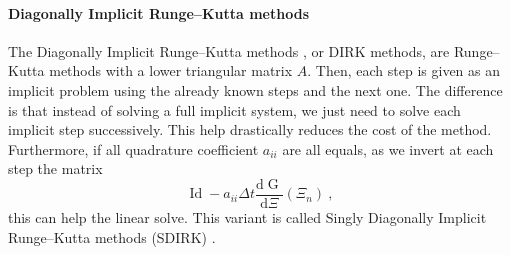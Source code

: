         \paragraph{Diagonally Implicit Runge--Kutta methods}
        The Diagonally Implicit Runge--Kutta methods \cite{Alexander1977}, or DIRK methods, are Runge--Kutta methods with a lower triangular matrix $A$.
        Then, each step is given as an implicit problem using the already known steps and the next one.
        The difference is that instead of solving a full implicit system, we just need to solve each implicit step successively.
        This help drastically reduces the cost of the method.
        Furthermore, if all quadrature coefficient $a_{ii}$ are all equals, as we invert at each step the matrix
        \begin{equation}
          \operatorname{Id} - a_{ii} \Delta t \frac{\mathrm{d} \operatorname{G}}{\mathrm{d} \Xi}\left(\Xi_n\right) \ ,
        \end{equation}
        this can help the linear solve.
        This variant is called Singly Diagonally Implicit Runge--Kutta methods (SDIRK) \cite{HairerWanner1996}.

